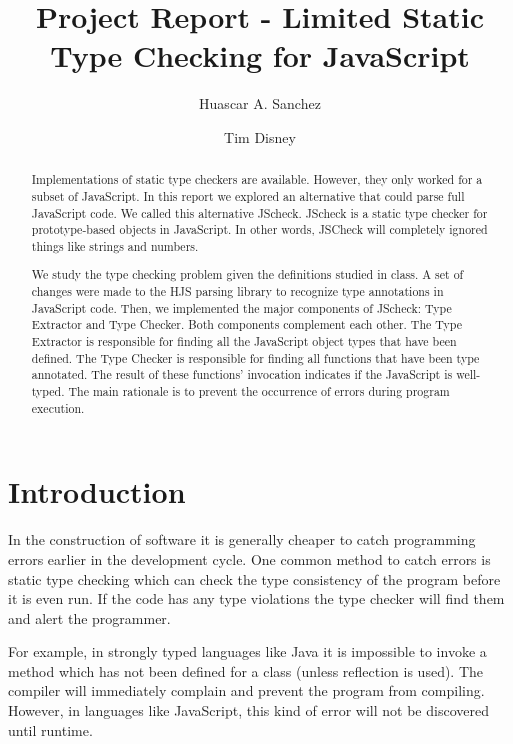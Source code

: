 \documentclass{article}
\begin{document}
\title{Project Report - Limited Static Type Checking for JavaScript}
\author{Huascar A. Sanchez \and Tim Disney}

\maketitle

\lstset{showstringspaces=false}

\begin{abstract}
Implementations of static type checkers are available. However, they only worked
for a subset of JavaScript. In this report we explored an alternative that could 
parse full JavaScript code. We called this alternative JScheck. JScheck is a static 
type checker for prototype-based objects in JavaScript. In other words, JSCheck will 
completely ignored things like strings and numbers. 

We study the type checking problem given the definitions studied in class. A set of
changes were made to the HJS parsing library to recognize type annotations in 
JavaScript code. Then, we implemented the major components of JScheck: Type Extractor
and Type Checker. Both components complement each other. The Type Extractor is 
responsible for finding all the JavaScript object types that have been defined. The 
Type Checker is responsible for finding all functions that have been type annotated. 
The result of these functions' invocation indicates if the JavaScript is well-typed. 
The main rationale is to prevent the occurrence of errors during program execution. 
\end{abstract}

\section{Introduction}
In the construction of software it is generally cheaper to 
catch programming errors earlier in the development cycle. One common method 
to catch errors is static type checking which can
check the type consistency of the program before it is even
run. If the code has any type violations the type checker will 
find them and alert the programmer.

For example, in strongly typed languages like Java it is impossible 
to invoke a method which has not been defined for a class (unless reflection is used).
The compiler will immediately complain and prevent the program from compiling. However, 
in languages like JavaScript, this kind of error will not be discovered until runtime.
\end{document}
